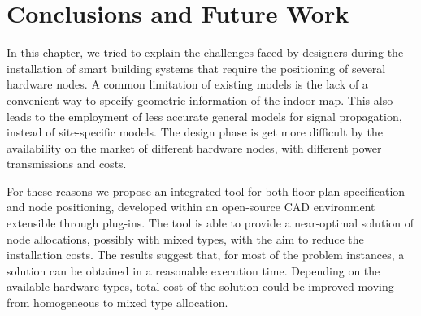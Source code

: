 

\section{Conclusions and Future Work}
In this chapter, we tried to explain the challenges faced by designers during the installation of smart building systems that require the positioning of several hardware nodes. A common limitation of existing models is the lack of a convenient way to specify geometric information of the indoor map. This also leads to the employment of less accurate general models for signal propagation, instead of site-specific models. The design phase is get more difficult by the availability on the market of different hardware nodes, with different power transmissions and costs.

For these reasons we propose an integrated tool for both floor plan specification and node positioning, developed within an \mbox{open-source} CAD environment extensible through plug-ins. The tool is able to provide a near-optimal solution of node allocations, possibly with mixed types, with the aim to reduce the installation costs. The results suggest that, for most of the problem instances, a solution can be obtained in a reasonable execution time. Depending on the available hardware types, total cost of the solution could be improved moving from homogeneous to mixed type allocation.

